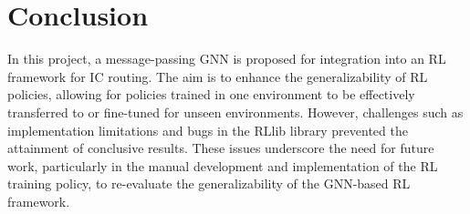 \documentclass[letterpaper]{article}
\begin{document}
\section{Conclusion}
In this project, a message-passing GNN is proposed for integration into an RL framework for IC routing. The aim is to enhance the generalizability of RL policies, allowing for policies trained in one environment to be effectively transferred to or fine-tuned for unseen environments. However, challenges such as implementation limitations and bugs in the RLlib library prevented the attainment of conclusive results. These issues underscore the need for future work, particularly in the manual development and implementation of the RL training policy, to re-evaluate the generalizability of the GNN-based RL framework.
    
{
\small


}

\end{document}

